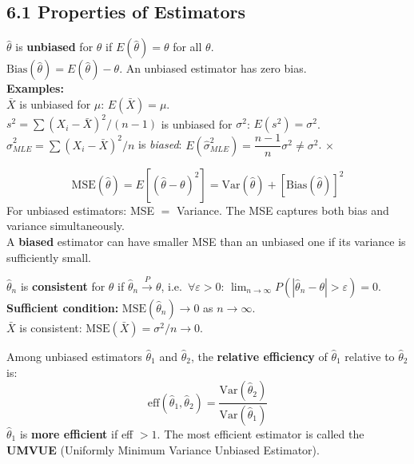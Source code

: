 \documentclass[12pt]{article}
\begin{document}
\subsection{6.1 Properties of Estimators}

\begin{defbox}[Unbiasedness]
$\hat\theta$ is \textbf{unbiased} for $\theta$ if $E(\hat\theta)=\theta$ for all $\theta$.\\[4pt]
$\text{Bias}(\hat\theta)=E(\hat\theta)-\theta$. An unbiased estimator has zero bias.\\[6pt]
\textbf{Examples:}\\
$\bar X$ is unbiased for $\mu$: $E(\bar X)=\mu$. \checkmark\\
$s^2=\sum(X_i-\bar X)^2/(n-1)$ is unbiased for $\sigma^2$: $E(s^2)=\sigma^2$. \checkmark\\
$\hat\sigma^2_{MLE}=\sum(X_i-\bar X)^2/n$ is \textit{biased}: $E(\hat\sigma^2_{MLE})=\dfrac{n-1}{n}\sigma^2\neq\sigma^2$. $\times$
\end{defbox}

\begin{defbox}
\[\text{MSE}(\hat\theta)=E\!\left[(\hat\theta-\theta)^2\right]=\text{Var}(\hat\theta)+[\text{Bias}(\hat\theta)]^2\]
For unbiased estimators: MSE $=$ Variance. The MSE captures both bias and variance simultaneously.\\[4pt]
A \textbf{biased} estimator can have smaller MSE than an unbiased one if its variance is sufficiently small.
\end{defbox}

\begin{defbox}[Consistency]
$\hat\theta_n$ is \textbf{consistent} for $\theta$ if $\hat\theta_n\xrightarrow{P}\theta$, i.e.\ $\forall\varepsilon>0$: $\lim_{n\to\infty}P(|\hat\theta_n-\theta|>\varepsilon)=0$.\\[4pt]
\textbf{Sufficient condition:} $\text{MSE}(\hat\theta_n)\to0$ as $n\to\infty$.\\[4pt]
$\bar X$ is consistent: $\text{MSE}(\bar X)=\sigma^2/n\to0$.
\end{defbox}

\begin{defbox}
Among unbiased estimators $\hat\theta_1$ and $\hat\theta_2$, the \textbf{relative efficiency} of $\hat\theta_1$ relative to $\hat\theta_2$ is:
\[\text{eff}(\hat\theta_1,\hat\theta_2)=\frac{\text{Var}(\hat\theta_2)}{\text{Var}(\hat\theta_1)}\]
$\hat\theta_1$ is \textbf{more efficient} if eff $>1$. The most efficient estimator is called the \textbf{UMVUE} (Uniformly Minimum Variance Unbiased Estimator).
\end{defbox}
\end{document}
